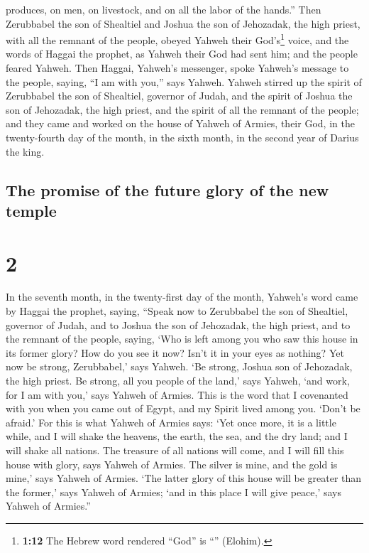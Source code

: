 produces, on men, on livestock, and on all the labor of the hands.''
 Then Zerubbabel the son of Shealtiel and Joshua the son
of Jehozadak, the high priest, with all the remnant of the people,
obeyed Yahweh their God's\footnote{\textbf{1:12} The Hebrew word
  rendered ``God'' is ``'' (Elohim).} voice, and the words
of Haggai the prophet, as Yahweh their God had sent him; and the people
feared Yahweh.  Then Haggai, Yahweh's messenger, spoke
Yahweh's message to the people, saying, ``I am with you,'' says Yahweh.
 Yahweh stirred up the spirit of Zerubbabel the son of
Shealtiel, governor of Judah, and the spirit of Joshua the son of
Jehozadak, the high priest, and the spirit of all the remnant of the
people; and they came and worked on the house of Yahweh of Armies, their
God,  in the twenty-fourth day of the month, in the sixth
month, in the second year of Darius the king.

\hypertarget{the-promise-of-the-future-glory-of-the-new-temple}{%
\subsection{The promise of the future glory of the new
temple}\label{the-promise-of-the-future-glory-of-the-new-temple}}

\hypertarget{section-1}{%
\section{2}\label{section-1}}

 In the seventh month, in the twenty-first day of the
month, Yahweh's word came by Haggai the prophet, saying, 
``Speak now to Zerubbabel the son of Shealtiel, governor of Judah, and
to Joshua the son of Jehozadak, the high priest, and to the remnant of
the people, saying,  `Who is left among you who saw this
house in its former glory? How do you see it now? Isn't it in your eyes
as nothing?  Yet now be strong, Zerubbabel,' says Yahweh.
`Be strong, Joshua son of Jehozadak, the high priest. Be strong, all you
people of the land,' says Yahweh, `and work, for I am with you,' says
Yahweh of Armies.  This is the word that I covenanted with
you when you came out of Egypt, and my Spirit lived among you. `Don't be
afraid.'  For this is what Yahweh of Armies says: `Yet
once more, it is a little while, and I will shake the heavens, the
earth, the sea, and the dry land;  and I will shake all
nations. The treasure of all nations will come, and I will fill this
house with glory, says Yahweh of Armies.  The silver is
mine, and the gold is mine,' says Yahweh of Armies.  `The
latter glory of this house will be greater than the former,' says Yahweh
of Armies; `and in this place I will give peace,' says Yahweh of
Armies.''


